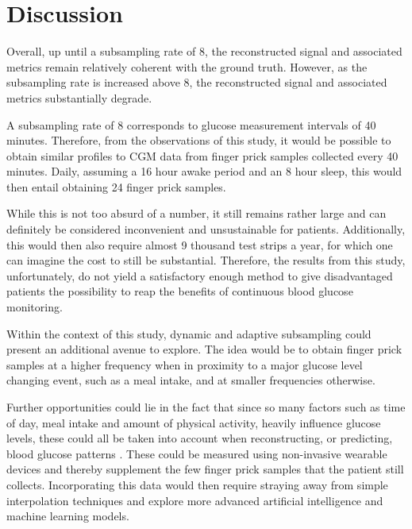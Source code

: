 
\section{Discussion}

Overall, up until a subsampling rate of 8, the reconstructed signal and associated metrics remain relatively coherent with the ground truth. However, as the subsampling rate is increased above 8, the reconstructed signal and associated metrics substantially degrade.

A subsampling rate of 8 corresponds to glucose measurement intervals of 40 minutes. Therefore, from the observations of this study, it would be possible to obtain similar profiles to CGM data from finger prick samples collected every 40 minutes. Daily, assuming a 16 hour awake period and an 8 hour sleep, this would then entail obtaining 24 finger prick samples.

While this is not too absurd of a number, it still remains rather large and can definitely be considered inconvenient and unsustainable for patients. Additionally, this would then also require almost 9 thousand test strips a year, for which one can imagine the cost to still be substantial. Therefore, the results from this study, unfortunately, do not yield a satisfactory enough method to give disadvantaged patients the possibility to reap the benefits of continuous blood glucose monitoring.

Within the context of this study, dynamic and adaptive subsampling could present an additional avenue to explore. The idea would be to obtain finger prick samples at a higher frequency when in proximity to a major glucose level changing event, such as a meal intake, and at smaller frequencies otherwise. 

Further opportunities could lie in the fact that since so many factors such as time of day, meal intake and amount of physical activity, heavily influence glucose levels, these could all be taken into account when reconstructing, or predicting, blood glucose patterns  \cite{noauthor_42_2018}. These could be measured using non-invasive wearable devices and thereby supplement the few finger prick samples that the patient still collects. Incorporating this data would then require straying away from simple interpolation techniques and explore more advanced artificial intelligence and machine learning models.


